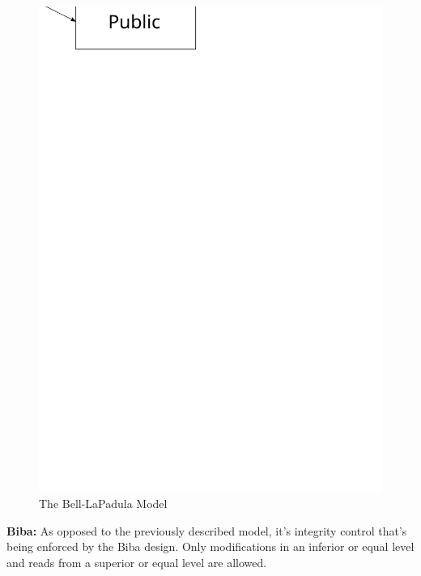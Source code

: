 \documentclass[pdftex,a4paper,titlepage,11pt]{article}
\begin{document}
\begin{figure}[h]
	\centering
	\includegraphics[scale=0.5]{bell-lp}
	\caption{The Bell-LaPadula Model}
\end{figure}

\bigskip

\textbf{Biba:} As opposed to the previously described model, it's integrity
control that's being enforced by the Biba design. Only modifications in an
inferior or equal level and reads from a superior or equal level are allowed.
\end{document}
